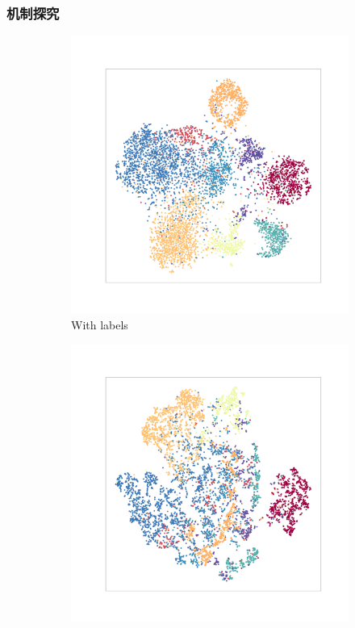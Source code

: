 \documentclass[bachelor, nocolorlinks, printoneside]{seuthesis} %
\begin{document}
\begin{Main}
\subsubsection{机制探究}
\begin{figure}
	\begin{subfigure}[t]{0.3\linewidth} \centering 
     \includegraphics[width=\columnwidth]{figs/T-SNE-class.png}
     \caption{With labels}\label{fig:T-SNE1}
   \end{subfigure}
   \begin{subfigure}[t]{0.3\linewidth} \centering
    \includegraphics[width=\columnwidth]{figs/T-SNE-noclass.png}

\end{subfigure}
\end{figure}
\end{Main}
\end{document}
